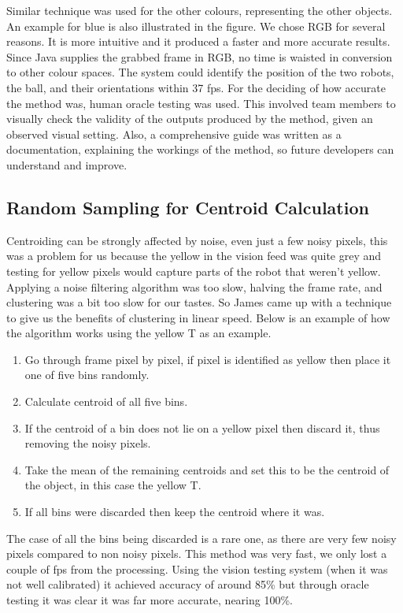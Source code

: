Similar technique was used for the other colours, representing the other objects. An example for blue is also illustrated in the figure. We chose RGB for several reasons. It is more intuitive and it produced a faster and more accurate results. Since Java supplies the grabbed frame in RGB, no time is waisted in conversion to other colour spaces. The system could identify the position of the two robots, the ball, and their orientations within 37 fps. For the deciding of how accurate the method was, human oracle testing was used. This involved team members to visually check the validity of the outputs produced by the method, given an observed visual setting. Also, a comprehensive guide was written as a documentation, explaining the workings of the method, so future developers can understand and improve. 

\subsection{Random Sampling for Centroid Calculation}

Centroiding can be strongly affected by noise, even just a few noisy pixels, this was a problem for us because the yellow in the vision feed was quite grey and testing for yellow pixels would capture parts of the robot that weren't yellow.  Applying a noise filtering algorithm was too slow, halving the frame rate, and clustering was a bit too slow for our tastes.  So James came up with a technique to give us the benefits of clustering in linear speed.  Below is an example of how the algorithm works using the yellow T as an example.
\begin{enumerate}
\item Go through frame pixel by pixel, if pixel is identified as yellow then place it one of five bins randomly.
\item Calculate centroid of all five bins.
\item If the centroid of a bin does not lie on a yellow pixel then discard it, thus removing the noisy pixels.
\item Take the mean of the remaining centroids and set this to be the centroid of the object, in this case the yellow T.
\item If all bins were discarded then keep the centroid where it was.
\end{enumerate}

The case of all the bins being discarded is a rare one, as there are very few noisy pixels compared to non noisy pixels.  This method was very fast, we only lost a couple of fps from the processing.  Using the vision testing system (when it was not well calibrated) it achieved accuracy of around 85\% but through oracle testing it was clear it was far more accurate, nearing 100\%.

